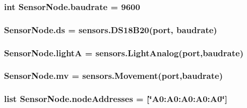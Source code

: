 \subsubsection[{\texorpdfstring{baudrate}{baudrate}}]{\setlength{\rightskip}{0pt plus 5cm}int Sensor\+Node.\+baudrate = 9600}\hypertarget{namespaceSensorNode_a50365066340e665ac5f274dfb3a7ae82}{}\label{namespaceSensorNode_a50365066340e665ac5f274dfb3a7ae82}
\subsubsection[{\texorpdfstring{ds}{ds}}]{\setlength{\rightskip}{0pt plus 5cm}Sensor\+Node.\+ds = {\bf sensors.\+D\+S18\+B20}({\bf port}, {\bf baudrate})}\hypertarget{namespaceSensorNode_aaa177ea377a1a6a4ae0b9426064e940d}{}\label{namespaceSensorNode_aaa177ea377a1a6a4ae0b9426064e940d}
\subsubsection[{\texorpdfstring{lightA}{lightA}}]{\setlength{\rightskip}{0pt plus 5cm}Sensor\+Node.\+lightA = {\bf sensors.\+Light\+Analog}({\bf port},{\bf baudrate})}\hypertarget{namespaceSensorNode_a973908ebd2519a83b199d68f97f31a3f}{}\label{namespaceSensorNode_a973908ebd2519a83b199d68f97f31a3f}
\subsubsection[{\texorpdfstring{mv}{mv}}]{\setlength{\rightskip}{0pt plus 5cm}Sensor\+Node.\+mv = {\bf sensors.\+Movement}({\bf port},{\bf baudrate})}\hypertarget{namespaceSensorNode_ad06784c1a82686d5c2d6908f088c16f6}{}\label{namespaceSensorNode_ad06784c1a82686d5c2d6908f088c16f6}
\subsubsection[{\texorpdfstring{node\+Addresses}{nodeAddresses}}]{\setlength{\rightskip}{0pt plus 5cm}list Sensor\+Node.\+node\+Addresses = \mbox{[}\char`\"{}A0\+:\+A0\+:\+A0\+:\+A0\+:\+A0\char`\"{}\mbox{]}}\hypertarget{namespaceSensorNode_ac1e752b62092c1c9e27da570c73c0ce7}{}\label{namespaceSensorNode_ac1e752b62092c1c9e27da570c73c0ce7}
